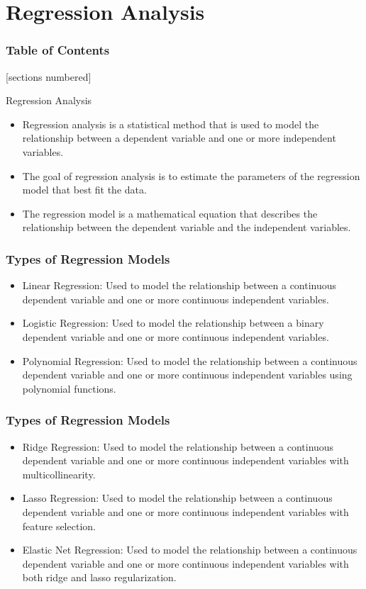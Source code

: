 \documentclass[serif, 9pt, aspectratio=32]{beamer}
\begin{document}
\section{Regression Analysis}

\begin{frame}
    \frametitle{Table of Contents}
    [sections numbered]
    \tableofcontents[currentsection]
\end{frame}

\begin{frame}{Regression Analysis}
    \begin{itemize}
        \item Regression analysis is a statistical method that is used to model the relationship between a dependent variable and one or more independent variables.
        \item The goal of regression analysis is to estimate the parameters of the regression model that best fit the data.
        \item The regression model is a mathematical equation that describes the relationship between the dependent variable and the independent variables.
    \end{itemize}
\end{frame}

\begin{frame}
    \frametitle{Types of Regression Models}
    \begin{itemize}
        \setlength{\itemsep}{2em}
        \item Linear Regression: Used to model the relationship between a continuous dependent variable and one or more continuous independent variables.
        \item Logistic Regression: Used to model the relationship between a binary dependent variable and one or more continuous independent variables.
        \item Polynomial Regression: Used to model the relationship between a continuous dependent variable and one or more continuous independent variables using polynomial functions.
    \end{itemize}
\end{frame}

\begin{frame}
    \frametitle{Types of Regression Models}
    \begin{itemize}
        \setlength{\itemsep}{2em}
        \item Ridge Regression: Used to model the relationship between a continuous dependent variable and one or more continuous independent variables with multicollinearity.
        \item Lasso Regression: Used to model the relationship between a continuous dependent variable and one or more continuous independent variables with feature selection.
        \item Elastic Net Regression: Used to model the relationship between a continuous dependent variable and one or more continuous independent variables with both ridge and lasso regularization.
    \end{itemize}
\end{frame}
\end{document}
